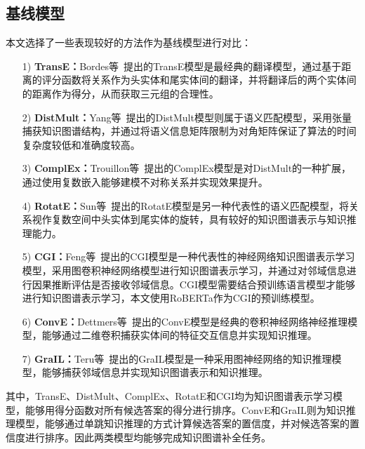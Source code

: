 \documentclass[algorithmlist, AutoFakeBold, AutoFakeSlant, figurelist, tablelist, nomlist, engineering, openany]{seuthesix} %
\begin{document}
\subsection{基线模型}
本文选择了一些表现较好的方法作为基线模型进行对比：
\begin{itemize}
  \item [1)]\textbf{TransE：}Bordes等~\cite{bordes2013translating}提出的TransE模型是最经典的翻译模型，通过基于距离的评分函数将关系作为头实体和尾实体间的翻译，并将翻译后的两个实体间的距离作为得分，从而获取三元组的合理性。
  \item [2)]\textbf{DistMult：}Yang等~\cite{yang2015embedding}提出的DistMult模型则属于语义匹配模型，采用张量捕获知识图谱结构，并通过将语义信息矩阵限制为对角矩阵保证了算法的时间复杂度较低和准确度较高。
  \item [3)]\textbf{ComplEx：}Trouillon等~\cite{trouillon2016complex}提出的ComplEx模型是对DistMult的一种扩展，通过使用复数嵌入能够建模不对称关系并实现效果提升。
  \item [4)]\textbf{RotatE：}Sun等~\cite{sun2018rotate}提出的RotatE模型是另一种代表性的语义匹配模型，将关系视作复数空间中头实体到尾实体的旋转，具有较好的知识图谱表示与知识推理能力。
  \item [5)]\textbf{CGI：}Feng等~\cite{feng2021should}提出的CGI模型是一种代表性的神经网络知识图谱表示学习模型，采用图卷积神经网络模型进行知识图谱表示学习，并通过对邻域信息进行因果推断评估是否接收邻域信息。CGI模型需要结合预训练语言模型才能够进行知识图谱表示学习，本文使用RoBERTa作为CGI的预训练模型。
  \item [6)]\textbf{ConvE：}Dettmers等~\cite{dettmers2018convolutional}提出的ConvE模型是经典的卷积神经网络神经推理模型，能够通过二维卷积捕获实体间的特征交互信息并实现知识推理。
  \item [7)]\textbf{GraIL：}Teru等~\cite{teru2020inductive}提出的GraIL模型是一种采用图神经网络的知识推理模型，能够捕获邻域信息并实现知识图谱表示和知识推理。
\end{itemize}

其中，TransE、DistMult、ComplEx、RotatE和CGI均为知识图谱表示学习模型，能够用得分函数对所有候选答案的得分进行排序。ConvE和GraIL则为知识推理模型，能够通过单跳知识推理的方式计算候选答案的置信度，并对候选答案的置信度进行排序。因此两类模型均能够完成知识图谱补全任务。
\end{document}
